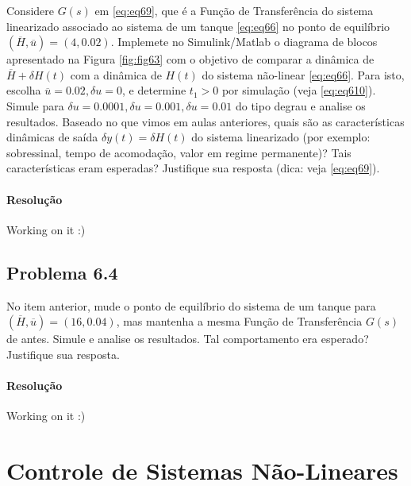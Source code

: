 \documentclass[
]{book}
\theoremstyle{definition}
\theoremstyle{definition}
\theoremstyle{definition}
\theoremstyle{remark}
\begin{document}
Considere \(G(s)\) em \eqref{eq:eq69}, que é a Função de Transferência do sistema linearizado associado ao sistema de um tanque \eqref{eq:eq66} no ponto de equilíbrio \((\overline{H}, \overline{u}) = (4, 0.02)\). Implemete no Simulink/Matlab o diagrama de blocos apresentado na Figura \ref{fig:fig63} com o objetivo de comparar a dinâmica de \(\overline{H} + \delta H(t)\) com a dinâmica de \(H(t)\) do sistema não-linear \eqref{eq:eq66}. Para isto, escolha \(\overline{u} = 0.02, \delta u = 0\), e determine \(t_1 > 0\) por simulação (veja \eqref{eq:eq610}). Simule para \(\delta u = 0.0001, \delta u = 0.001, \delta u = 0.01\) do tipo degrau e analise os resultados. Baseado no que vimos em aulas anteriores, quais são as características dinâmicas de saída \(\delta y(t) = \delta H(t)\) do sistema linearizado (por exemplo: sobressinal, tempo de acomodação, valor em regime permanente)? Tais características eram esperadas? Justifique sua resposta (dica: veja \eqref{eq:eq69}).

\hypertarget{resoluuxe7uxe3o-18}{%
\subsubsection*{Resolução}\label{resoluuxe7uxe3o-18}}

Working on it :)

\hypertarget{problema-6.4}{%
\section*{Problema 6.4}\label{problema-6.4}}

No item anterior, mude o ponto de equilíbrio do sistema de um tanque para \((\overline{H}, \overline{u}) = (16, 0.04)\), mas mantenha a mesma Função de Transferência \(G(s)\) de antes. Simule e analise os resultados. Tal comportamento era esperado? Justifique sua resposta.

\hypertarget{resoluuxe7uxe3o-19}{%
\subsubsection*{Resolução}\label{resoluuxe7uxe3o-19}}

Working on it :)

\hypertarget{lab7}{%
\chapter{Controle de Sistemas Não-Lineares}\label{lab7}}
\end{document}
